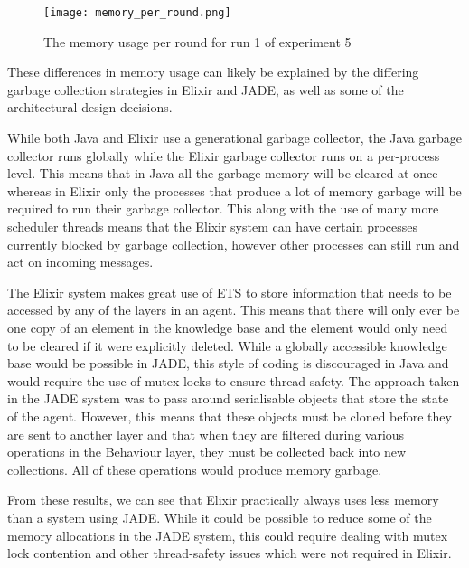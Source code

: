 \begin{figure}[h]
    \centering
    \texttt{[image: memory\_per\_round.png]}
    \caption{The memory usage per round for run 1 of experiment 5}\label{fig:memory_per_round}
\end{figure}

These differences in memory usage can likely be explained by the differing garbage collection strategies in Elixir and JADE, as well as some of the architectural design decisions.

While both Java and Elixir use a generational garbage collector, the Java garbage collector runs globally while the Elixir garbage collector runs on a per-process level.
This means that in Java all the garbage memory will be cleared at once whereas in Elixir only the processes that produce a lot of memory garbage will be required to run their garbage collector.
This along with the use of many more scheduler threads means that the Elixir system can have certain processes currently blocked by garbage collection, however other processes can still run and act on incoming messages.

The Elixir system makes great use of ETS to store information that needs to be accessed by any of the layers in an agent.
This means that there will only ever be one copy of an element in the knowledge base and the element would only need to be cleared if it were explicitly deleted.
While a globally accessible knowledge base would be possible in JADE, this style of coding is discouraged in Java and would require the use of mutex locks to ensure thread safety.
The approach taken in the JADE system was to pass around serialisable objects that store the state of the agent.
However, this means that these objects must be cloned before they are sent to another layer and that when they are filtered during various operations in the Behaviour layer, they must be collected back into new collections.
All of these operations would produce memory garbage.

From these results, we can see that Elixir practically always uses less memory than a system using JADE\@.
While it could be possible to reduce some of the memory allocations in the JADE system, this could require dealing with mutex lock contention and other thread-safety issues which were not required in Elixir.
